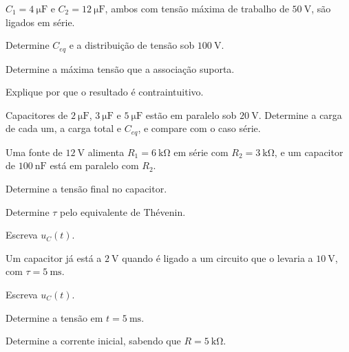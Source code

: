 \blocoaprofundamento
\begin{questao}[3]{}

$C_1=\SI{4}{\micro\farad}$ e $C_2=\SI{12}{\micro\farad}$, ambos com tensão
máxima de trabalho de $\SI{50}{\volt}$, são ligados em série.
\begin{itensq}
\item Determine $C_{eq}$ e a distribuição de tensão sob $\SI{100}{\volt}$.
\item Determine a máxima tensão que a associação suporta.
\item Explique por que o resultado é contraintuitivo.
\end{itensq}


\end{questao}
\begin{questao}[3]{}

Capacitores de $\SI{2}{\micro\farad}$, $\SI{3}{\micro\farad}$ e
$\SI{5}{\micro\farad}$ estão em paralelo sob $\SI{20}{\volt}$. Determine a
carga de cada um, a carga total e $C_{eq}$, e compare com o caso série.


\end{questao}
\begin{questao}[3]{}

Uma fonte de $\SI{12}{\volt}$ alimenta $R_1=\SI{6}{\kilo\ohm}$ em série com
$R_2=\SI{3}{\kilo\ohm}$, e um capacitor de $\SI{100}{\nano\farad}$ está em
paralelo com $R_2$.
\begin{itensq}
\item Determine a tensão final no capacitor.
\item Determine $\tau$ pelo equivalente de Thévenin.
\item Escreva $u_C(t)$.
\end{itensq}


\end{questao}
\begin{questao}[3]{}

Um capacitor já está a $\SI{2}{\volt}$ quando é ligado a um circuito que o
levaria a $\SI{10}{\volt}$, com $\tau=\SI{5}{\milli\second}$.
\begin{itensq}
\item Escreva $u_C(t)$.
\item Determine a tensão em $t=\SI{5}{\milli\second}$.
\item Determine a corrente inicial, sabendo que $R=\SI{5}{\kilo\ohm}$.
\end{itensq}


\end{questao}
